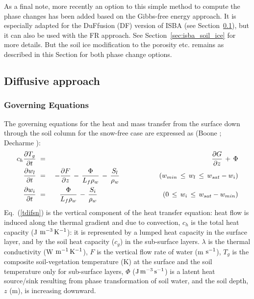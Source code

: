 As a final note, more recently an option to this simple method to
compute the phase changes has been
added based on the Gibbs-free energy approach. It is especially
adapted for the DuFfusion (DF) version of ISBA (see
Section~\ref{sec:isba_diffusion_soil}), but it can also be used with
the FR approach. See Section~\ref{sec:isba_soil_ice} for more details.
But the soil ice modification to the porosity etc. remains as described
in this Section for both phase change options.

\subsection{Diffusive approach}
\label{sec:isba_diffusion_soil}

%
\subsubsection{Governing Equations}
%
The governing equations for the heat and mass transfer
from the surface down through the soil column for the snow-free
case are expressed as (Boone ; Decharme ):
%
\begin{eqnarray}
c_h\frac{\partial T_g}{ \partial t } \,\,&=&\,\,
\frac{\partial G }{ \partial z} 
\,+\,\Phi \label{tdifsn} \\
%
\frac{\partial w_l }{\partial t} \,\,&=&\,\,
-\frac{\partial F}{\partial z} \,-\, \frac{\Phi}{ L_f \rho_w}\,-\, \frac{S_l}{ \rho_w}
\hskip.8in (w_{min}\,\leq\, w_l\,\leq\,w_{sat}-w_i) \label{cont1}\\
%
\frac{\partial w_i}{\partial t} \,\,&=&\,\,
\frac{\Phi}{ L_f \rho_w} \,-\, \frac{S_i}{ \rho_w}
\hskip1.32in (0 \,\leq\, w_i\,\leq\,w_{sat}-w_{min})\label{ice} 
\end {eqnarray}
%
Eq.~(\ref{tdifsn}) is the vertical component of the 
heat transfer equation: heat flow is induced
along the thermal gradient and due to convection,
$c_h$ is the total heat capacity
(J ${\rm m^{-3}\,K^{-1}}$): it is represented by
a lumped heat capacity in the surface layer, and by
the soil heat capacity ($c_g$) in the sub-surface layers.
$\lambda$ is the thermal conductivity (W ${\rm m^{-1}\,K^{-1}}$),
$F$ is the vertical flow rate of water (m ${\rm s^{-1}}$),
$T_g$ is the composite soil-vegetation  temperature (K) at the surface
and the soil temperature only for sub-surface layers, $\Phi$ (${\rm J \, m^{-3}\,s^{-1}}$)
is a latent heat
source/sink resulting from phase transformation of soil water,
and the soil depth, $z$ (m), is increasing downward.

